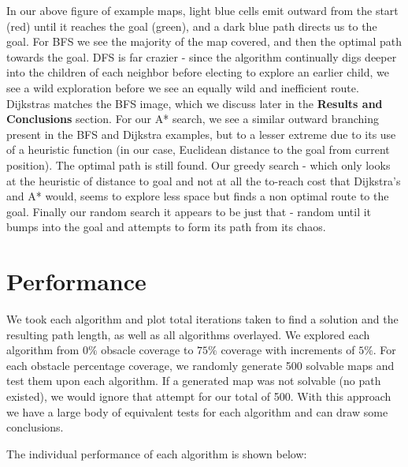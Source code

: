 \documentclass{article}
\begin{document}
In our above figure of example maps, light blue cells emit outward from the start (red) until it reaches the goal (green), and a dark blue path directs us to the goal. For BFS we see the majority of the map covered, and then the optimal path towards the goal. DFS is far crazier - since the algorithm continually digs deeper into the children of each neighbor before electing to explore an earlier child, we see a wild exploration before we see an equally wild and inefficient route. Dijkstras matches the BFS image, which we discuss later in the \textbf{Results and Conclusions} section. For our A* search, we see a similar outward branching present in the BFS and Dijkstra examples, but to a lesser extreme due to its use of a heuristic function (in our case, Euclidean distance to the goal from current position). The optimal path is still found. Our greedy search - which only looks at the heuristic of distance to goal and not at all the to-reach cost that Dijkstra's and A* would, seems to explore less space but finds a non optimal route to the goal. Finally our random search it appears to be just that - random until it bumps into the goal and attempts to form its path from its chaos.

\section*{Performance}

We took each algorithm and plot total iterations taken to find a solution and the resulting path length, as well as all algorithms overlayed. We explored each algorithm from $0\%$ obsacle coverage to $75\%$ coverage with increments of $5\%$. For each obstacle percentage coverage, we randomly generate 500 solvable maps and test them upon each algorithm. If a generated map was not solvable (no path existed), we would ignore that attempt for our total of 500. With this approach we have a large body of equivalent tests for each algorithm and can draw some conclusions.

The individual performance of each algorithm is shown below:
\end{document}
